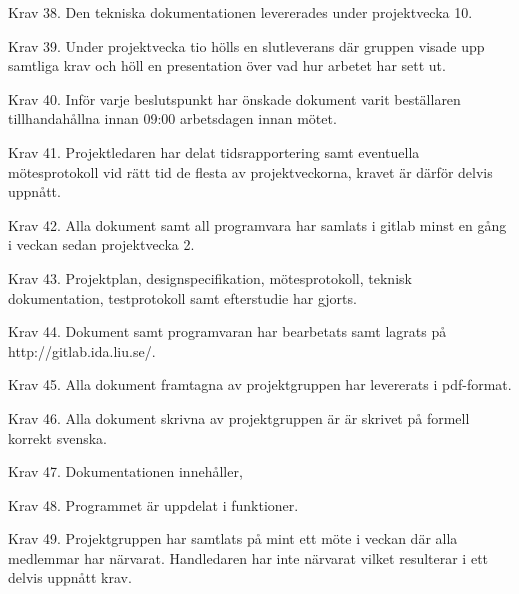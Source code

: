\documentclass[10pt,oneside,swedish]{lips-no_customer}
\begin{document}
Krav 38. Den tekniska dokumentationen levererades under projektvecka 10. 

Krav 39. Under projektvecka tio hölls en slutleverans där gruppen visade upp
samtliga krav och höll en presentation över vad hur arbetet har sett ut. 

Krav 40. Inför varje beslutspunkt har önskade dokument varit beställaren
tillhandahållna innan 09:00 arbetsdagen innan mötet. 

Krav 41. Projektledaren har delat tidsrapportering samt eventuella
mötesprotokoll vid rätt tid de flesta av projektveckorna, kravet är därför
delvis uppnått.

Krav 42. Alla dokument samt all programvara har samlats i gitlab minst en gång i
veckan sedan projektvecka 2. 

Krav 43. Projektplan, designspecifikation, mötesprotokoll, teknisk
dokumentation, testprotokoll samt efterstudie har gjorts. 

Krav 44. Dokument samt programvaran har bearbetats samt lagrats på
http://gitlab.ida.liu.se/.  

Krav 45. Alla dokument framtagna av projektgruppen har levererats i pdf-format. 

Krav 46. Alla dokument skrivna av projektgruppen är är skrivet på formell
korrekt svenska.

Krav 47. Dokumentationen innehåller, 

Krav 48. Programmet är uppdelat i funktioner. 

Krav 49. Projektgruppen har samtlats på mint ett möte i veckan där alla
medlemmar har närvarat. Handledaren har inte närvarat vilket resulterar i ett
delvis uppnått krav. 
\end{document}
